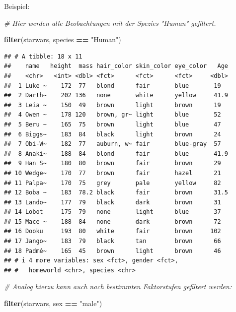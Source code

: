 \documentclass[
  ngerman,
]{book}
\newenvironment{Shaded}{\begin{snugshade}}{\end{snugshade}}
\newcommand{\CommentTok}[1]{\textcolor[rgb]{0.56,0.35,0.01}{\textit{#1}}}
\newcommand{\FunctionTok}[1]{\textcolor[rgb]{0.13,0.29,0.53}{\textbf{#1}}}
\newcommand{\NormalTok}[1]{#1}
\newcommand{\SpecialCharTok}[1]{\textcolor[rgb]{0.81,0.36,0.00}{\textbf{#1}}}
\newcommand{\StringTok}[1]{\textcolor[rgb]{0.31,0.60,0.02}{#1}}
\begin{document}
Beispiel:

\begin{Shaded}
\begin{Highlighting}[]
\CommentTok{\# Hier werden alle Beobachtungen mit der Spezies "Human" gefiltert.}

\FunctionTok{filter}\NormalTok{(starwars, species }\SpecialCharTok{==} \StringTok{"Human"}\NormalTok{)}
\end{Highlighting}
\end{Shaded}

\begin{verbatim}
## # A tibble: 18 x 11
##    name   height  mass hair_color skin_color eye_color   Age
##    <chr>   <int> <dbl> <fct>      <fct>      <fct>     <dbl>
##  1 Luke ~    172  77   blond      fair       blue       19  
##  2 Darth~    202 136   none       white      yellow     41.9
##  3 Leia ~    150  49   brown      light      brown      19  
##  4 Owen ~    178 120   brown, gr~ light      blue       52  
##  5 Beru ~    165  75   brown      light      blue       47  
##  6 Biggs~    183  84   black      light      brown      24  
##  7 Obi-W~    182  77   auburn, w~ fair       blue-gray  57  
##  8 Anaki~    188  84   blond      fair       blue       41.9
##  9 Han S~    180  80   brown      fair       brown      29  
## 10 Wedge~    170  77   brown      fair       hazel      21  
## 11 Palpa~    170  75   grey       pale       yellow     82  
## 12 Boba ~    183  78.2 black      fair       brown      31.5
## 13 Lando~    177  79   black      dark       brown      31  
## 14 Lobot     175  79   none       light      blue       37  
## 15 Mace ~    188  84   none       dark       brown      72  
## 16 Dooku     193  80   white      fair       brown     102  
## 17 Jango~    183  79   black      tan        brown      66  
## 18 Padmé~    165  45   brown      light      brown      46  
## # i 4 more variables: sex <fct>, gender <fct>,
## #   homeworld <chr>, species <chr>
\end{verbatim}

\begin{Shaded}
\begin{Highlighting}[]
\CommentTok{\# Analog hierzu kann auch nach bestimmten Faktorstufen gefiltert werden:}

\FunctionTok{filter}\NormalTok{(starwars, sex }\SpecialCharTok{==} \StringTok{"male"}\NormalTok{)}
\end{Highlighting}
\end{Shaded}
\end{document}
